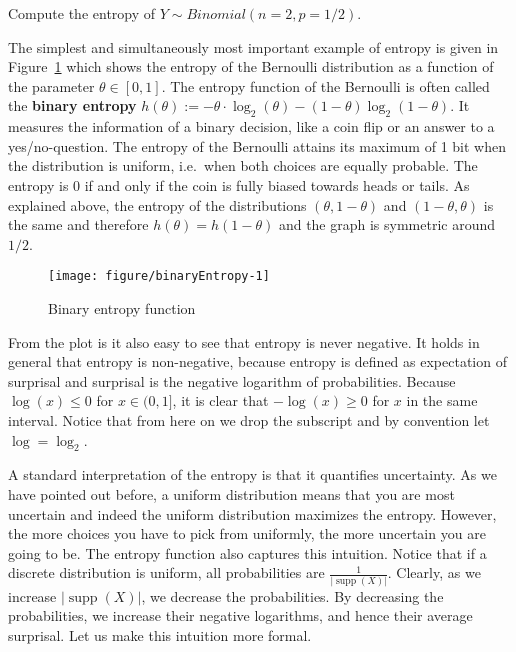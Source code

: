 \documentclass[11pt,leqno,a4paper]{report}\usepackage[]{graphicx}\usepackage[]{color}
\makeatletter
\def\maxwidth{ %
  \ifdim\Gin@nat@width>\linewidth
    \linewidth
  \else
    \Gin@nat@width
  \fi
}
\newenvironment{knitrout}{}{} %
\newcommand{\supp}{\operatorname{supp}}
\makeatother
\begin{document}
\begin{Exercise}
Compute the entropy of $Y \sim Binomial(n=2,p=1/2)$.
\end{Exercise}

The simplest and simultaneously most important example of entropy is given in Figure~\ref{fig:binaryEntropy} which shows the entropy of the Bernoulli distribution as a function of the parameter $ \theta \in [0,1]$. The entropy function of the Bernoulli is often called the \textbf{binary entropy} $h(\theta) := -\theta \cdot \log_2(\theta) - (1-\theta) \log_2(1-\theta)$. It measures the information of a binary decision, like a coin flip or an answer to a yes/no-question.
The entropy of the Bernoulli attains its maximum of 1 bit when the distribution is uniform, i.e.\ when both choices are equally 
probable. The entropy is 0 if and only if the coin is fully biased towards heads or tails. As explained above, the entropy of the distributions $(\theta, 1-\theta)$ and $(1-\theta,\theta)$ is the same and therefore $h(\theta)=h(1-\theta)$ and the graph is symmetric around $1/2$.

\begin{knitrout}
\color{fgcolor}\begin{figure}[t!]

{\centering \texttt{[image: figure/binaryEntropy-1]} 

}

\caption[Binary entropy function]{Binary entropy function}\label{fig:binaryEntropy}
\end{figure}


\end{knitrout}

\medskip
From the plot is it also easy to see that entropy is never negative. It holds in general that entropy is non-negative,
because entropy is defined as expectation of surprisal and surprisal is the negative logarithm of probabilities. 
Because $ \log(x) \leq 0 $ for $ x \in (0,1] $, it is clear that $ -\log(x) \geq 0 $ for $ x $ in the same
interval. Notice that from here on we drop the subscript and by convention let $ \log = \log_{2} $.

A standard interpretation of the entropy is that it quantifies uncertainty. As we have pointed out before, a uniform distribution means that you are most uncertain and indeed the uniform distribution maximizes the entropy. However, the more choices you have to pick from uniformly, the more uncertain you are going to be.  The entropy function also captures this intuition. Notice that if a discrete distribution is uniform, all probabilities are $ \frac{1}{|\supp(X)|} $. Clearly, as we increase $ |\supp(X)| $, we decrease the probabilities. By decreasing the probabilities, we increase their negative logarithms, and hence their average surprisal. Let us make this intuition more formal.
\end{document}
